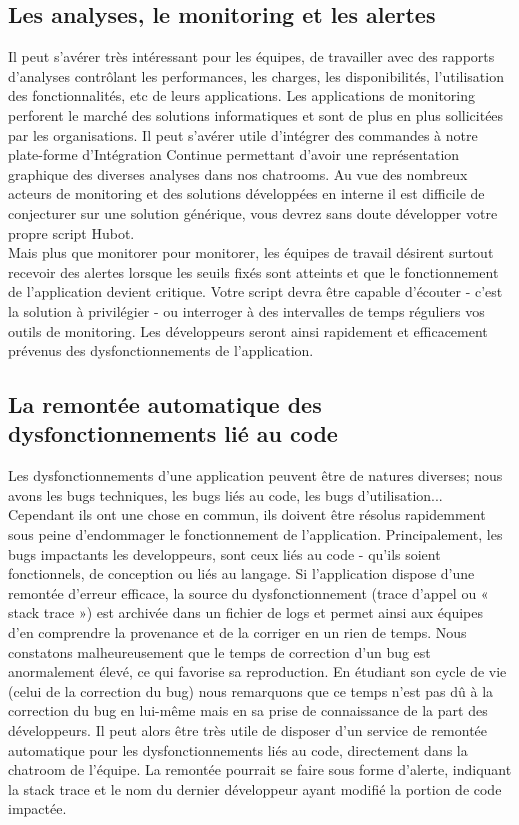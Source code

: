       \subsection{Les analyses, le monitoring et les alertes}
      Il peut s'avérer très intéressant pour les équipes, de travailler avec des rapports d'analyses contrôlant les performances, les charges, les disponibilités, l'utilisation des fonctionnalités, etc de leurs applications. Les applications de monitoring perforent le marché des solutions informatiques et sont de plus en plus sollicitées par les organisations. Il peut s'avérer utile d'intégrer des commandes à notre plate-forme d'Intégration Continue permettant d'avoir une représentation graphique des diverses analyses dans nos chatrooms. Au vue des nombreux acteurs de monitoring et des solutions développées en interne il est difficile de conjecturer sur une solution générique, vous devrez sans doute développer votre propre script Hubot.\\

      Mais plus que monitorer pour monitorer, les équipes de travail désirent surtout recevoir des alertes lorsque les seuils fixés sont atteints et que le fonctionnement de l'application devient critique. Votre script devra être capable d'écouter - c'est la solution à privilégier - ou interroger à des intervalles de temps réguliers vos outils de monitoring. Les développeurs seront ainsi rapidement et efficacement prévenus des dysfonctionnements de l'application.

      \subsection{La remontée automatique des dysfonctionnements lié au code}
      Les dysfonctionnements d'une application peuvent être de natures diverses; nous avons les bugs techniques, les bugs liés au code, les bugs d'utilisation... Cependant ils ont une chose en commun, ils doivent être résolus rapidemment sous peine d'endommager le fonctionnement de l'application. Principalement, les bugs impactants les developpeurs, sont ceux liés au code - qu'ils soient fonctionnels, de conception ou liés au langage. Si l'application dispose d'une remontée d'erreur efficace, la source du dysfonctionnement (trace d'appel ou « \gls{stack trace} ») est archivée dans un fichier de logs et permet ainsi aux équipes d'en comprendre la provenance et de la corriger en un rien de temps. Nous constatons malheureusement que le temps de correction d'un bug est anormalement élevé, ce qui favorise sa reproduction. En étudiant son cycle de vie (celui de la correction du bug) nous remarquons que ce temps n'est pas dû à la correction du bug en lui-même mais en sa prise de connaissance de la part des développeurs. Il peut alors être très utile de disposer d'un service de remontée automatique pour les dysfonctionnements liés au code, directement dans la chatroom de l'équipe. La remontée pourrait se faire sous forme d'alerte, indiquant la stack trace et le nom du dernier développeur ayant modifié la portion de code impactée.\\

